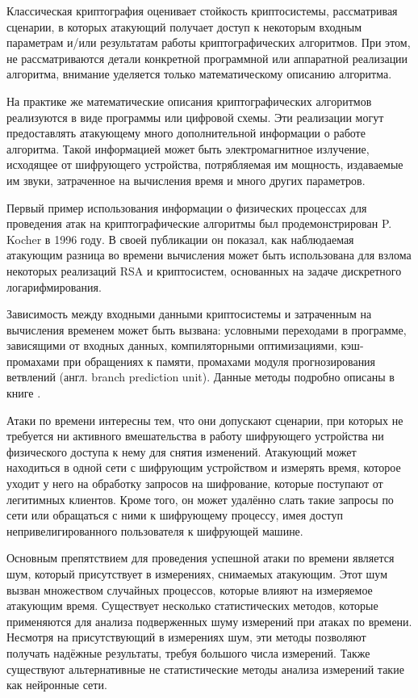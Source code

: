 
Классическая криптография оценивает стойкость криптосистемы, рассматривая сценарии, в
которых атакующий получает доступ к некоторым входным параметрам и/или результатам
работы криптографических алгоритмов. При этом, не рассматриваются детали
конкретной программной или аппаратной реализации алгоритма, внимание уделяется
только математическому описанию алгоритма.

На практике же математические описания криптографических алгоритмов реализуются
в виде программы или цифровой схемы. Эти реализации могут предоставлять атакующему
много дополнительной информации о работе алгоритма. Такой информацией может быть
электромагнитное излучение, исходящее от шифрующего устройства, потрябляемая им
мощность, издаваемые им звуки, затраченное на вычисления время и много других
параметров.

Первый пример использования информации о физических процессах для проведения
атак на криптографические алгоритмы был продемонстрирован P. Kocher в 1996 году.
В своей публикации \cite{kocher} он показал, как наблюдаемая атакующим разница во
времени вычисления может быть использована для взлома некоторых реализаций RSA
и криптосистем, основанных на задаче дискретного логарифмирования.

Зависимость между входными данными криптосистемы и затраченным на вычисления
временем может быть вызвана: условными переходами в программе, зависящими от
входных данных, компиляторными оптимизациями, кэш-промахами при обращениях к памяти,
промахами модуля прогнозирования ветвлений (англ. branch prediction unit).
Данные методы подробно описаны в книге \cite{cren}.

Атаки по времени интересны тем, что они допускают сценарии, при которых не
требуется ни активного вмешательства в
работу шифрующего устройства ни физического доступа к нему для снятия изменений.
Атакующий может находиться в одной сети с шифрующим устройством и измерять
время, которое уходит у него на обработку запросов на шифрование, которые
поступают от легитимных клиентов. Кроме того, он может удалённо слать такие
запросы по сети или обращаться с ними к шифрующему процессу, имея доступ
непривелигированного пользователя к шифрующей машине.

Основным препятствием для проведения успешной атаки по времени является шум,
который присутствует в измерениях, снимаемых атакующим. Этот шум вызван
множеством случайных процессов, которые влияют на измеряемое атакующим время.
Существует несколько статистических методов, которые применяются для анализа
подверженных шуму измерений при атаках по времени. Несмотря на присутствующий
в измерениях шум, эти методы позволяют получать надёжные результаты, требуя
большого числа измерений. Также существуют альтернативные не статистические
методы анализа измерений такие как нейронные сети.

